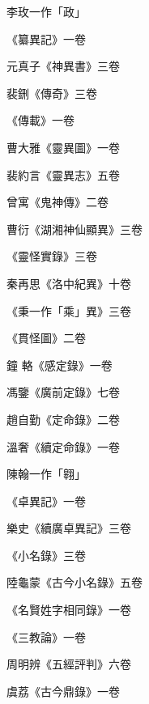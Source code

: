 \begin{pinyinscope}
 李玫一作「政」



 《纂異記》一卷



 元真子《神異書》三卷



 裴鉶《傳奇》三卷



 《傳載》一卷



 曹大雅《靈異圖》一卷



 裴約言《靈異志》五卷



 曾寓《鬼神傳》二卷



 曹衍《湖湘神仙顯異》三卷



 《靈怪實錄》三卷



 秦再思《洛中紀異》十卷



 《秉一作「乘」異》三卷



 《貫怪圖》二卷



 鐘
 輅《感定錄》一卷



 馮鑒《廣前定錄》七卷



 趙自勤《定命錄》二卷



 溫奢《續定命錄》一卷



 陳翰一作「翱」



 《卓異記》一卷



 樂史《續廣卓異記》三卷



 《小名錄》三卷



 陸龜蒙《古今小名錄》五卷



 《名賢姓字相同錄》一卷



 《三教論》一卷



 周明辨《五經評判》六卷



 虞荔《古今鼎錄》一卷




\end{pinyinscope}
